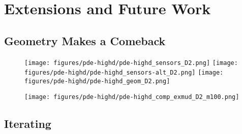 \section{Extensions and Future Work}


\subsection{Geometry Makes a Comeback}

\begin{frame}

\begin{figure}
\centering
\texttt{[image: figures/pde-highd/pde-highd\_sensors\_D2.png]}
\texttt{[image: figures/pde-highd/pde-highd\_sensors-alt\_D2.png]}
\texttt{[image: figures/pde-highd/pde-highd\_geom\_D2.png]}
\label{fig:pde-highd-2d-geometry}
\end{figure}

\end{frame}


\begin{frame}

\begin{figure}
  \texttt{[image: figures/pde-highd/pde-highd\_comp\_exmud\_D2\_m100.png]}
\label{fig:pde-highd-2d-scalar-vs-alt}
\end{figure}

\end{frame}


\subsection{Iterating}

